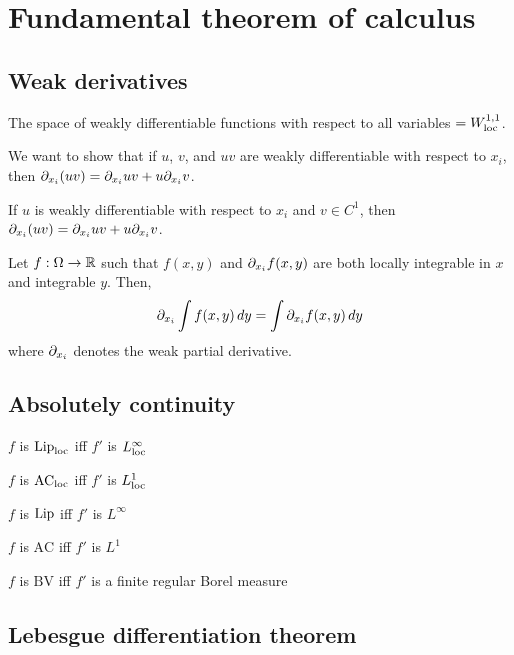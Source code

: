 \documentclass{../note}
\begin{document}
\part{Fundamental theorem of calculus}

\chapter{Weak derivatives}

The space of weakly differentiable functions with respect to all variables $=W_{\mathrm{loc}}^{1,1}$.

\begin{prb}
We want to show that if $u$, $v$, and $uv$ are weakly differentiable with respect to $x_i$, then $\pd_{x_i}(uv)=\pd_{x_i}uv+u\pd_{x_i}v$.
\begin{parts}
\item If $u$ is weakly differentiable with respect to $x_i$ and $v\in C^1$, then $\pd_{x_i}(uv)=\pd_{x_i}uv+u\pd_{x_i}v$.
\end{parts}
\end{prb}


\begin{prb}
Let $f:\Omega\to\mathbb{R}$
such that $f(x,y)$ and $\pd_{x_i}f(x,y)$ are both locally integrable in $x$ and integrable $y$.
Then,
\[\pd_{x_i}\int f(x,y)\,dy=\int\pd_{x_i}f(x,y)\,dy\]
where $\pd_{x_i}$ denotes the weak partial derivative.
\end{prb}





\chapter{Absolutely continuity}

\begin{parts}
\item $f$ is $\operatorname{Lip}_{\mathrm{loc}}$ iff $f'$ is $L_{\mathrm{loc}}^\infty$
\item $f$ is $\textrm{AC}_{\mathrm{loc}}$ iff $f'$ is $L_{\mathrm{loc}}^1$
\end{parts}
\begin{parts}
\item $f$ is $\operatorname{Lip}$ iff $f'$ is $L^\infty$
\item $f$ is $\textrm{AC}$ iff $f'$ is $L^1$
\item $f$ is $\textrm{BV}$ iff $f'$ is a finite regular Borel measure
\end{parts}



\chapter{Lebesgue differentiation theorem}
\end{document}
